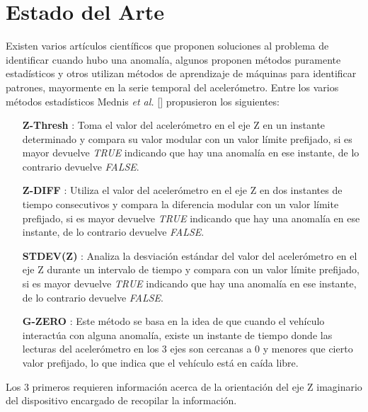 \chapter{Estado del Arte}\label{chapter:state-of-the-art}

Existen varios artículos científicos que proponen soluciones al problema de identificar cuando hubo una anomalía, algunos proponen métodos
puramente estadísticos y otros utilizan métodos de aprendizaje de máquinas para identificar patrones, mayormente en la serie temporal del
acelerómetro. Entre los varios métodos estadísticos Mednis {\it et al.} [] propusieron los siguientes:\\

\begin{enumerate}
\item [ \textbf {Z-Thresh} ]: Toma el valor del acelerómetro en el eje Z en un instante determinado y compara su valor modular con 
	un valor límite prefijado, si es mayor devuelve {\it TRUE} indicando que hay una anomalía en ese instante, de lo contrario devuelve {\it FALSE}.\\
	\item [ \textbf {Z-DIFF} ]: Utiliza el valor del acelerómetro en el eje Z en dos instantes de tiempo consecutivos y compara la
		diferencia modular con un valor límite prefijado, si es mayor devuelve {\it TRUE} indicando que hay una anomalía en ese instante, de lo contrario devuelve {\it FALSE}.\\
	\item [ \textbf {STDEV(Z)} ]: Analiza la desviación estándar del valor del acelerómetro en el eje Z durante un intervalo de
		tiempo y compara con un valor límite prefijado, si es mayor devuelve {\it TRUE} indicando que hay una anomalía en ese instante, de lo contrario devuelve {\it FALSE}.\\ 
	\item [ \textbf {G-ZERO} ]: Este método se basa en la idea de que cuando el vehículo interactúa con alguna anomalía, existe un
		instante de tiempo donde las lecturas del acelerómetro en los 3 ejes son cercanas a 0 y menores que cierto valor prefijado, lo que indica que el vehículo está en caída libre.\\
\end{enumerate}

Los 3 primeros requieren información acerca de la orientación del eje Z imaginario del dispositivo encargado de recopilar la información.\\

